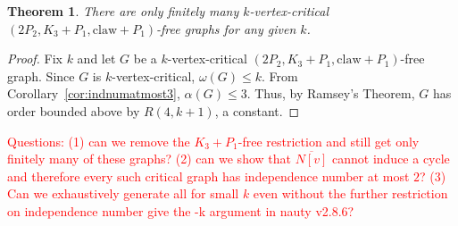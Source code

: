 \documentclass[11pt]{article}
\newtheorem{theorem}{Theorem}[section]
\theoremstyle{definition}
\newcommand{\noneighbs}{\overline{N[v]}}
\begin{document}
\begin{theorem}
There are only finitely many $k$-vertex-critical $(2P_2, K_3 + P_1, \text{claw} + P_1)$-free graphs for any given $k$.
\end{theorem}
\begin{proof}
Fix $k$ and let $G$ be a $k$-vertex-critical $(2P_2, K_3 + P_1, \text{claw} + P_1)$-free graph. Since $G$ is $k$-vertex-critical, $\omega(G)\le k$. From Corollary~\ref{cor:indnumatmost3}, $\alpha(G)\le 3$. Thus, by Ramsey's Theorem, $G$ has order bounded above by $R(4,k+1)$, a constant.
\end{proof}

\textcolor{red}{Questions: (1) can we remove the $K_3+P_1$-free restriction and still get only finitely many of these graphs? (2) can we show that $\noneighbs$ cannot induce a cycle and therefore every such critical graph has independence number at most $2$? (3) Can we exhaustively generate all for small $k$ even without the further restriction on independence number give the -k argument in nauty v2.8.6?}
\end{document}
